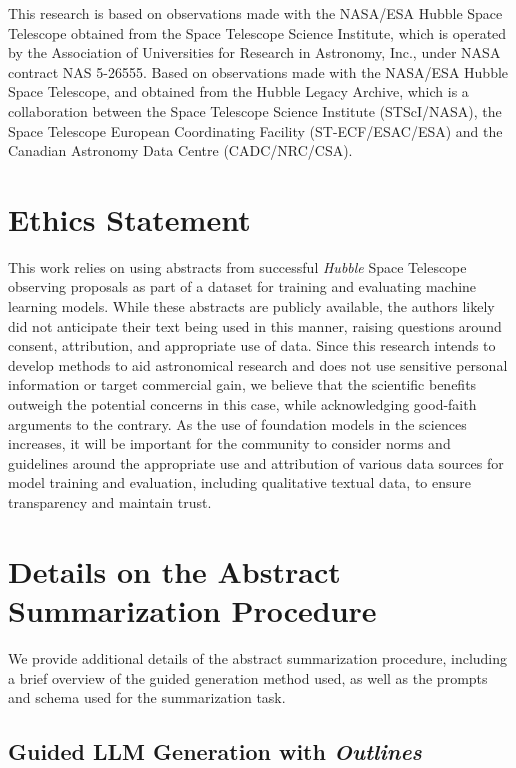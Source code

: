 \documentclass{article} %
\newcommand{\package}[1]{\textsl{#1}\xspace}
\newcommand{\hubble}{\emph{Hubble}\xspace}
\begin{document}
This research is based on observations made with the NASA/ESA Hubble Space Telescope obtained from the Space Telescope Science Institute, which is operated by the Association of Universities for Research in Astronomy, Inc., under NASA contract NAS 5-26555.
%
Based on observations made with the NASA/ESA Hubble Space Telescope, and obtained from the Hubble Legacy Archive, which is a collaboration between the Space Telescope Science Institute (STScI/NASA), the Space Telescope European Coordinating Facility (ST-ECF/ESAC/ESA) and the Canadian Astronomy Data Centre (CADC/NRC/CSA).

\section{Ethics Statement}
This work relies on using abstracts from successful \hubble Space Telescope observing proposals as part of a dataset for training and evaluating machine learning models. While these abstracts are publicly available, the authors likely did not anticipate their text being used in this manner, raising questions around consent, attribution, and appropriate use of data. Since this research intends to develop methods to aid astronomical research and does not use sensitive personal information or target commercial gain, we believe that the scientific benefits outweigh the potential concerns in this case, while acknowledging good-faith arguments to the contrary. As the use of foundation models in the sciences increases, it will be important for the community to consider norms and guidelines around the appropriate use and attribution of various data sources for model training and evaluation, including qualitative textual data, to ensure transparency and maintain trust.




\appendix

\section{Details on the Abstract Summarization Procedure}

We provide additional details of the abstract summarization procedure, including a brief overview of the guided generation method used, as well as the prompts and schema used for the summarization task.

\subsection{Guided LLM Generation with \package{Outlines}}
\label{app:guided-generation}
\end{document}
